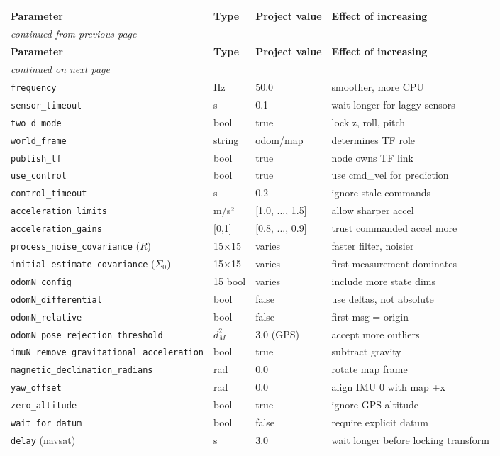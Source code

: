 \documentclass[11pt,a4paper]{article}
\begin{document}
\begin{center}
\footnotesize
\begin{longtable}{p{4.0cm} p{2.0cm} p{2.0cm} p{6.0cm}}
\toprule
\textbf{Parameter} & \textbf{Type} & \textbf{Project value} & \textbf{Effect of increasing} \\
\midrule
\endfirsthead
\multicolumn{4}{l}{\itshape continued from previous page} \\
\toprule
\textbf{Parameter} & \textbf{Type} & \textbf{Project value} & \textbf{Effect of increasing} \\
\midrule
\endhead
\multicolumn{4}{l}{\itshape continued on next page} \\
\endfoot
\bottomrule
\endlastfoot
\texttt{frequency} & Hz & 50.0 & smoother, more CPU \\
\texttt{sensor\_timeout} & s & 0.1 & wait longer for laggy sensors \\
\texttt{two\_d\_mode} & bool & true & lock z, roll, pitch \\
\texttt{world\_frame} & string & odom/map & determines TF role \\
\texttt{publish\_tf} & bool & true & node owns TF link \\
\texttt{use\_control} & bool & true & use cmd\_vel for prediction \\
\texttt{control\_timeout} & s & 0.2 & ignore stale commands \\
\texttt{acceleration\_limits} & m/s² & [1.0, ..., 1.5] & allow sharper accel \\
\texttt{acceleration\_gains} & [0,1] & [0.8, ..., 0.9] & trust commanded accel more \\
\texttt{process\_noise\_covariance} ($R$) & 15$\times$15 & varies & faster filter, noisier \\
\texttt{initial\_estimate\_covariance} ($\Sigma_0$) & 15$\times$15 & varies & first measurement dominates \\
\texttt{odomN\_config} & 15 bool & varies & include more state dims \\
\texttt{odomN\_differential} & bool & false & use deltas, not absolute \\
\texttt{odomN\_relative} & bool & false & first msg = origin \\
\texttt{odomN\_pose\_rejection\_threshold} & $d_M^2$ & 3.0 (GPS) & accept more outliers \\
\texttt{imuN\_remove\_gravitational\_acceleration} & bool & true & subtract gravity \\
\texttt{magnetic\_declination\_radians} & rad & 0.0 & rotate map frame \\
\texttt{yaw\_offset} & rad & 0.0 & align IMU 0 with map +x \\
\texttt{zero\_altitude} & bool & true & ignore GPS altitude \\
\texttt{wait\_for\_datum} & bool & false & require explicit datum \\
\texttt{delay} (navsat) & s & 3.0 & wait longer before locking transform \\
\end{longtable}
\end{center}
\end{document}
